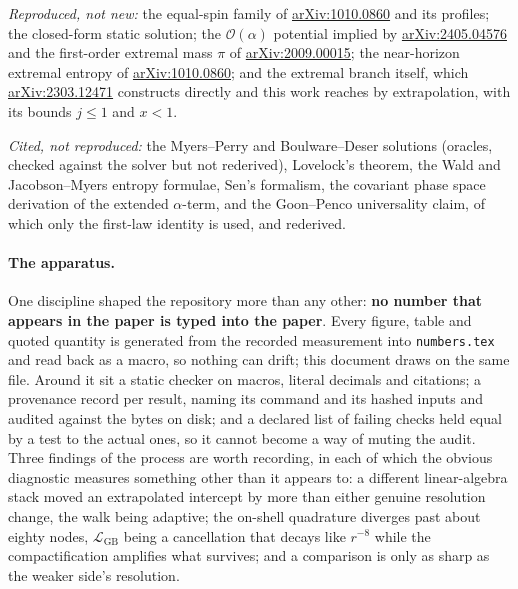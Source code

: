 \documentclass[10pt,a4paper]{article}
\newcommand{\GB}{\mathrm{GB}}
\newcommand{\aX}[1]{\href{https://arxiv.org/abs/#1}{arXiv:#1}}
\begin{document}
\emph{Reproduced, not new:} the equal-spin family of \aX{1010.0860} and its
profiles; the closed-form static solution; the $\mathcal O(\alpha)$
potential implied by \aX{2405.04576} and the first-order extremal mass $\pi$ of
\aX{2009.00015}; the near-horizon extremal entropy of \aX{1010.0860}; and the
extremal branch itself, which \aX{2303.12471} constructs directly and this work
reaches by extrapolation, with its bounds $j\le1$ and $x<1$.

\emph{Cited, not reproduced:} the Myers--Perry and Boulware--Deser solutions
(oracles, checked against the solver but not rederived), Lovelock's theorem, the Wald and Jacobson--Myers entropy formulae, Sen's
formalism, the covariant phase space derivation of the extended $\alpha$-term,
and the Goon--Penco universality claim, of which only the first-law identity is
used, and rederived.

\paragraph{The apparatus.}
One discipline shaped the repository more than any other: \textbf{no number that
appears in the paper is typed into the paper}. Every figure, table and quoted
quantity is generated from the recorded measurement into \texttt{numbers.tex}
and read back as a macro, so nothing can drift; this document draws on the same
file. Around it sit a static checker on macros, literal decimals and citations;
a provenance record per result, naming its command and its hashed inputs and
audited against the bytes on disk; and a declared list of failing checks held
equal by a test to the actual ones, so it cannot become a way of muting the
audit. Three findings of the process are worth
recording, in each of which the obvious diagnostic measures something other than
it appears to: a different linear-algebra stack moved an extrapolated intercept
by more than either genuine resolution change, the walk being adaptive; the
on-shell quadrature diverges past about eighty nodes, $\mathcal L_\GB$ being a
cancellation that decays like $r^{-8}$ while the compactification amplifies what
survives; and a comparison is only as sharp as the weaker side's resolution.
\end{document}
